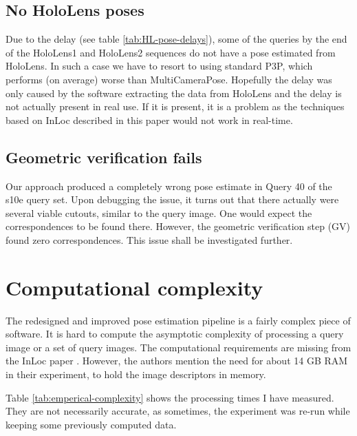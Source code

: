 \documentclass[twoside]{ctuthesis}
\theoremstyle{plain}
\theoremstyle{definition}
\theoremstyle{note}
\begin{document}
\subsection{No HoloLens poses}
Due to the delay (see table \ref{tab:HL-pose-delays}), some of the queries by the end of the HoloLens1 and HoloLens2 sequences do not have a pose estimated from HoloLens. In such a case we have to resort to using standard P3P, which performs (on average) worse than MultiCameraPose. Hopefully the delay was only caused by the software extracting the data from HoloLens and the delay is not actually present in real use. If it is present, it is a problem as the techniques based on InLoc described in this paper would not work in real-time.

\subsection{Geometric verification fails}
\label{subsection:GV-fails}
Our approach produced a completely wrong pose estimate in Query 40 of the s10e query set. Upon debugging the issue, it turns out that there actually were several viable cutouts, similar to the query image. One would expect the correspondences to be found there. However, the geometric verification step (GV) found zero correspondences. This issue shall be investigated further.

\section{Computational complexity}
The redesigned and improved pose estimation pipeline is a fairly complex piece of software. It is hard to compute the asymptotic complexity of processing a query image or a set of query images. The computational requirements are missing from the InLoc paper \cite{taira2018inloc}. However, the authors mention the need for about 14 GB RAM in their experiment, to hold the image descriptors in memory.

Table \ref{tab:emperical-complexity} shows the processing times I have measured. They are not necessarily accurate, as sometimes, the experiment was re-run while keeping some previously computed data.
\end{document}
